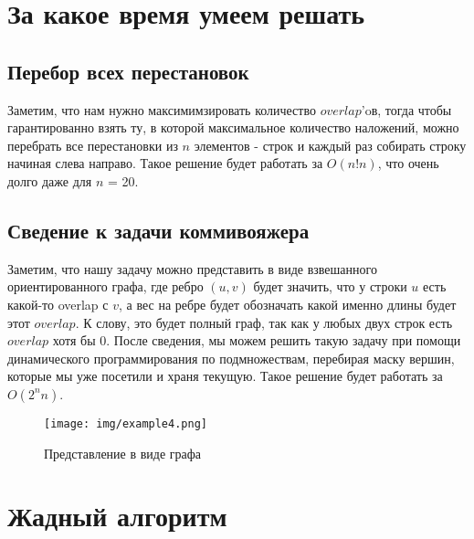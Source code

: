 \documentclass{article}
\begin{document}
\newpage
\section{За какое время умеем решать}
\subsection{Перебор всех перестановок}
Заметим, что нам нужно максимимзировать количество ${overlap}$'oв, тогда чтобы гарантированно взять ту, в которой максимальное количество наложений, можно перебрать все перестановки из ${n}$ элементов - строк и каждый раз собирать строку начиная слева направо. \newline
Такое решение будет работать за ${O(n!n)}$, что очень долго даже для $n$ = 20. 

\subsection{Сведение к задачи коммивояжера}
Заметим, что нашу задачу можно представить в виде взвешанного ориентированного графа, где ребро $(u, v)$ будет значить, что у строки ${u}$ есть какой-то {overlap} с ${v}$, а вес на ребре будет обозначать какой именно длины будет этот ${overlap}$. К слову, это будет полный граф, так как у любых двух строк есть ${overlap}$ хотя бы $0$. \newline
После сведения, мы можем решить такую задачу при помощи динамического программирования по подмножествам, перебирая маску вершин, которые мы уже посетили и храня текущую.
\newline
Такое решение будет работать за ${O(2^n n)}$.

\begin{figure}[htbp]
    \center
    \texttt{[image: img/example4.png]}
    \caption{Представление в виде графа}
\end{figure}



\newpage
\section{Жадный алгоритм}
\end{document}
